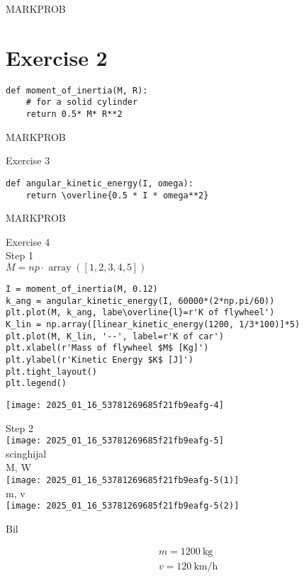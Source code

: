 \documentclass[10pt]{article}
\begin{document}
MARKPROB

\section*{Exercise 2}
\begin{verbatim}
def moment_of_inertia(M, R):
    # for a solid cylinder
    return 0.5* M* R**2
\end{verbatim}

MARKPROB

Exercise 3

\begin{verbatim}
def angular_kinetic_energy(I, omega):
    return \overline{0.5 * I * omega**2}
\end{verbatim}

MARKPROB

Exercise 4\\
Step 1\\
$M=n p \cdot \operatorname{array}([1,2,3,4,5])$

\begin{verbatim}
I = moment_of_inertia(M, 0.12)
k_ang = angular_kinetic_energy(I, 60000*(2*np.pi/60))
plt.plot(M, k_ang, labe\overline{l}=r'K of flywheel')
K_lin = np.array([linear_kinetic_energy(1200, 1/3*100)]*5)
plt.plot(M, K_lin, '--', label=r'K of car')
plt.xlabel(r'Mass of flywheel $M$ [Kg]')
plt.ylabel(r'Kinetic Energy $K$ [J]')
plt.tight_layout()
plt.legend()
\end{verbatim}

\begin{center}
\texttt{[image: 2025\_01\_16\_53781269685f21fb9eafg-4]}
\end{center}

Step 2\\
\texttt{[image: 2025\_01\_16\_53781269685f21fb9eafg-5]}\\
scinghijal\\
M, W\\
\texttt{[image: 2025\_01\_16\_53781269685f21fb9eafg-5(1)]}\\
m, v\\
\texttt{[image: 2025\_01\_16\_53781269685f21fb9eafg-5(2)]}

Bil

$$
\begin{aligned}
& m=1200 \mathrm{~kg} \\
& v=120 \mathrm{~km} / \mathrm{h}
\end{aligned}
$$
\end{document}
